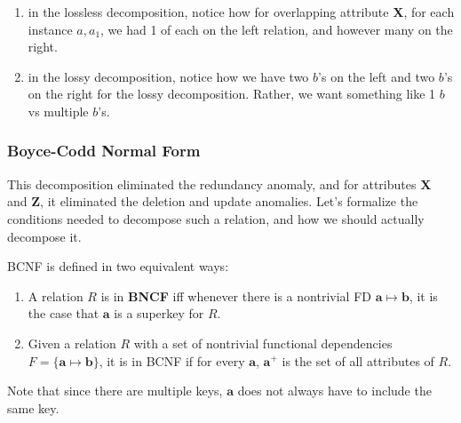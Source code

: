 \begin{example}
    \begin{enumerate}
      \item in the lossless decomposition, notice how for overlapping attribute \textbf{X}, for each instance $a, a_1$, we had 1 of each on the left relation, and however many on the right. 
      \item in the lossy decomposition, notice how we have two $b$'s on the left and two $b$'s on the right for the lossy decomposition. Rather, we want something like 1 $b$ vs multiple $b$'s.
    \end{enumerate}
  \end{example}

\subsubsection{Boyce-Codd Normal Form}

  This decomposition eliminated the redundancy anomaly, and for attributes \textbf{X} and \textbf{Z}, it eliminated the deletion and update anomalies. Let's formalize the conditions needed to decompose such a relation, and how we should actually decompose it. 

  \begin{definition}[BNCF]
    \label{def:bncf}
    BCNF is defined in two equivalent ways: 
    \begin{enumerate}
      \item A relation $R$ is in \textbf{BNCF} iff whenever there is a nontrivial FD $\mathbf{a} \mapsto \mathbf{b}$, it is the case that $\mathbf{a}$ is a superkey for $R$. 
      \item Given a relation $R$ with a set of nontrivial functional dependencies $F = \{\mathbf{a} \mapsto \mathbf{b}\}$, it is in BCNF if for every $\mathbf{a}$, $\mathbf{a}^+$ is the set of all attributes of $R$. 
    \end{enumerate}
    Note that since there are multiple keys, $\mathbf{a}$ does not always have to include the same key. 
  \end{definition}

